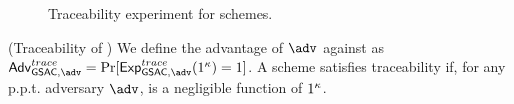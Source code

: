 \begin{figure}[htp!]
  \caption{Traceability experiment for \GSAC schemes.}
  \label{fig:exp-gsac-trace}
\end{figure}

\begin{definition}{(Traceability of \GSAC)}
  We define the advantage \AdvGSACTrace of $\adv$ against \ExpGSACTrace as
  $\AdvGSACTrace=\Pr\lbrack\ExpGSACTrace(1^\secpar)=1\rbrack$.
  A \GSAC scheme satisfies traceability if, for any p.p.t. adversary $\adv$,
  \AdvGSACTrace is a negligible function of $1^\kappa$.
\end{definition}

